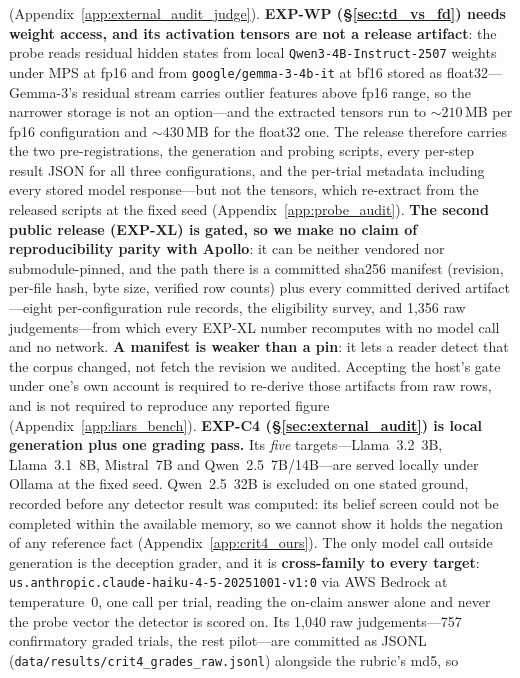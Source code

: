 \documentclass{article} %
\begin{document}
(Appendix~\ref{app:external_audit_judge}).
\textbf{EXP-WP (§\ref{sec:td_vs_fd}) needs weight access, and its activation
tensors are not a release artifact}: the probe reads residual hidden states from
local \texttt{Qwen3-4B-Instruct-2507} weights under MPS at fp16 and from
\texttt{google/gemma-3-4b-it} at bf16 stored as float32---Gemma-3's residual stream
carries outlier features above fp16 range, so the narrower storage is not an
option---and the extracted tensors run to ${\sim}210$\,MB per fp16 configuration and
${\sim}430$\,MB for the float32 one. The release therefore carries the two
pre-registrations, the generation and probing scripts, every per-step result JSON
for all three configurations, and the per-trial metadata including every
stored model response---but not the tensors, which re-extract from the released
scripts at the fixed seed (Appendix~\ref{app:probe_audit}).
\textbf{The second public release (EXP-XL) is gated, so we make no claim of
reproducibility parity with Apollo}: it can be neither vendored nor
submodule-pinned, and the path there is a committed sha256 manifest (revision,
per-file hash, byte size, verified row counts) plus every committed derived
artifact---eight per-configuration rule records, the eligibility survey, and
1{,}356 raw judgements---from which every EXP-XL number recomputes with no model
call and no network. \textbf{A manifest is weaker than a pin}: it lets a reader
detect that the corpus changed, not fetch the revision we audited. Accepting the
host's gate under one's own account is required to re-derive those artifacts from
raw rows, and is not required to reproduce any reported figure
(Appendix~\ref{app:liars_bench}).
\textbf{EXP-C4 (§\ref{sec:external_audit}) is local generation plus one grading pass.}
Its \emph{five} targets---Llama~3.2~3B, Llama~3.1~8B, Mistral~7B and
Qwen~2.5~7B/14B---are served locally under Ollama at the fixed seed. Qwen~2.5~32B is
excluded on one stated ground, recorded before any detector result was computed: its
belief screen could not be completed within the available memory, so we cannot show
it holds the negation of any reference fact (Appendix~\ref{app:crit4_ours}).
The only model call outside generation is the deception grader, and it is
\textbf{cross-family to every target}: \texttt{us.anthropic.claude-haiku-4-5-20251001-v1:0}
via AWS Bedrock at temperature~0, one call per trial, reading the on-claim answer
alone and never the probe vector the detector is scored on. Its 1{,}040 raw
judgements---757 confirmatory graded trials, the rest pilot---are committed as JSONL
(\texttt{data/results/crit4\_grades\_raw.jsonl}) alongside the rubric's md5, so
\end{document}
